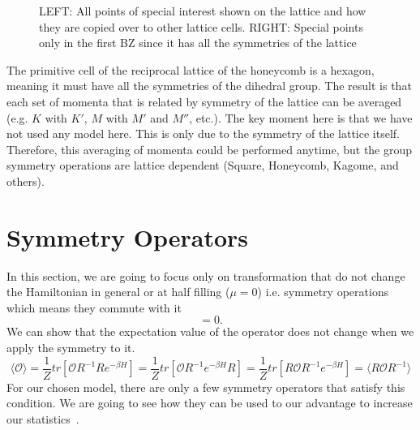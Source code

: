 \begin{figure}
\begin{center}
  \caption{LEFT: All points of special interest shown on the lattice and how they are copied over to other lattice cells. RIGHT: Special points only in the first BZ since it has all the symmetries of the lattice}
  \label{fig:points}
\end{center}
\end{figure}
The primitive cell of the reciprocal lattice of the honeycomb is a hexagon, meaning it must have all the symmetries of the dihedral group. The result is that each set of momenta that is related by symmetry of the lattice can be averaged (e.g. $K$ with $K'$, $M$ with $M'$ and $M''$, etc.). The key moment here is that we have not used any model here. This is only due to the symmetry of the lattice itself. Therefore, this averaging of momenta could be performed anytime, but the group symmetry operations are lattice dependent (Square, Honeycomb, Kagome, and others).

\section{Symmetry Operators}
\label{sec:sym-oper}
In this section, we are going to focus only on transformation that do not change the Hamiltonian in general or at half filling ($\mu=0$) i.e. symmetry operations which means they commute with it 
\begin{equation}
  [H,R] = 0.
\end{equation}
We can show that the expectation value of the operator does not change when we apply the symmetry to it.
\begin{equation}
 \langle \mathcal{O} \rangle = \frac{1}{Z} tr[\mathcal{O}R^{-1}Re^{-\beta H}] = \frac{1}{Z} tr[\mathcal{O}R^{-1}e^{-\beta H}R] = \frac{1}{Z} tr[R\mathcal{O}R^{-1}e^{-\beta H}] = \langle R\mathcal{O}R^{-1} \rangle
\end{equation}
For our chosen model, there are only a few symmetry operators that satisfy this condition. We are going to see how they can be used to our advantage to increase our statistics~\cite{evan}.

